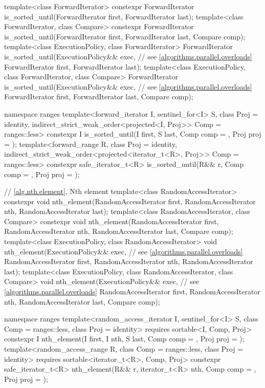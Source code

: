 \begin{codeblock}
{  template<class ForwardIterator>
    constexpr ForwardIterator
      is_sorted_until(ForwardIterator first, ForwardIterator last);
  template<class ForwardIterator, class Compare>
    constexpr ForwardIterator
      is_sorted_until(ForwardIterator first, ForwardIterator last,
                      Compare comp);
  template<class ExecutionPolicy, class ForwardIterator>
    ForwardIterator
      is_sorted_until(ExecutionPolicy&& exec,                   // see \ref{algorithms.parallel.overloads}
                      ForwardIterator first, ForwardIterator last);
  template<class ExecutionPolicy, class ForwardIterator, class Compare>
    ForwardIterator
      is_sorted_until(ExecutionPolicy&& exec,                   // see \ref{algorithms.parallel.overloads}
                      ForwardIterator first, ForwardIterator last,
                      Compare comp);

  namespace ranges {
    template<forward_iterator I, sentinel_for<I> S, class Proj = identity,
             indirect_strict_weak_order<projected<I, Proj>> Comp = ranges::less>
      constexpr I is_sorted_until(I first, S last, Comp comp = {}, Proj proj = {});
    template<forward_range R, class Proj = identity,
             indirect_strict_weak_order<projected<iterator_t<R>, Proj>> Comp = ranges::less>
      constexpr safe_iterator_t<R>
        is_sorted_until(R&& r, Comp comp = {}, Proj proj = {});
  }

  // \ref{alg.nth.element}, Nth element
  template<class RandomAccessIterator>
    constexpr void nth_element(RandomAccessIterator first, RandomAccessIterator nth,
                               RandomAccessIterator last);
  template<class RandomAccessIterator, class Compare>
    constexpr void nth_element(RandomAccessIterator first, RandomAccessIterator nth,
                               RandomAccessIterator last, Compare comp);
  template<class ExecutionPolicy, class RandomAccessIterator>
    void nth_element(ExecutionPolicy&& exec,                    // see \ref{algorithms.parallel.overloads}
                     RandomAccessIterator first, RandomAccessIterator nth,
                     RandomAccessIterator last);
  template<class ExecutionPolicy, class RandomAccessIterator, class Compare>
    void nth_element(ExecutionPolicy&& exec,                    // see \ref{algorithms.parallel.overloads}
                     RandomAccessIterator first, RandomAccessIterator nth,
                     RandomAccessIterator last, Compare comp);

  namespace ranges {
    template<random_access_iterator I, sentinel_for<I> S, class Comp = ranges::less,
             class Proj = identity>
      requires sortable<I, Comp, Proj>
      constexpr I
        nth_element(I first, I nth, S last, Comp comp = {}, Proj proj = {});
    template<random_access_range R, class Comp = ranges::less, class Proj = identity>
      requires sortable<iterator_t<R>, Comp, Proj>
      constexpr safe_iterator_t<R>
        nth_element(R&& r, iterator_t<R> nth, Comp comp = {}, Proj proj = {});
  }

}
\end{codeblock}
